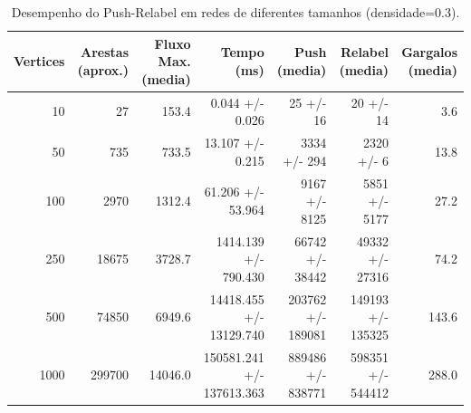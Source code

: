 \begin{table}
\caption{Desempenho do Push-Relabel em redes de diferentes tamanhos (densidade=0.3).}
\label{tab:escalabilidade}
\begin{tabular}{r r r r r r r}
\toprule
Vertices & Arestas (aprox.) & Fluxo Max. (media) & Tempo (ms) & Push (media) & Relabel (media) & Gargalos (media) \\
\midrule
10 & 27 & 153.4 & 0.044 +/- 0.026 & 25 +/- 16 & 20 +/- 14 & 3.6 \\
50 & 735 & 733.5 & 13.107 +/- 0.215 & 3334 +/- 294 & 2320 +/- 6 & 13.8 \\
100 & 2970 & 1312.4 & 61.206 +/- 53.964 & 9167 +/- 8125 & 5851 +/- 5177 & 27.2 \\
250 & 18675 & 3728.7 & 1414.139 +/- 790.430 & 66742 +/- 38442 & 49332 +/- 27316 & 74.2 \\
500 & 74850 & 6949.6 & 14418.455 +/- 13129.740 & 203762 +/- 189081 & 149193 +/- 135325 & 143.6 \\
1000 & 299700 & 14046.0 & 150581.241 +/- 137613.363 & 889486 +/- 838771 & 598351 +/- 544412 & 288.0 \\
\bottomrule
\end{tabular}
\end{table}
